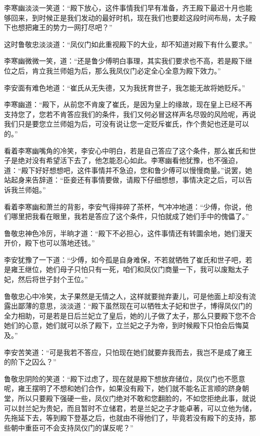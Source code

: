 李寒幽淡淡一笑道：“殿下放心，这件事情我们早有准备，齐王殿下最迟十月也能够回来，到时候正是我们发动的最好时机，现在我们也要趁这段时间布局，太子殿下也想把雍王的势力一网打尽吧？”

这时鲁敬忠淡淡道：“凤仪门如此重视殿下的大业，却不知道对殿下有什么要求。”

李寒幽微微一笑，道：“还是鲁少傅明白事理，其实我们要求也不高，若是殿下继位之后，肯立我兰师姐为后，那么我凤仪门必定全心全意为殿下效力。”

李安面有难色地道：“崔氏从无失德，又为我抚育世子，我怎能无故将她贬斥。”

李寒幽道：“殿下，从前您不肯废了崔氏，是因为皇上的缘故，现在皇上已经不再支持您了，您若不肯答应我们的条件，我们又何必冒这样声名尽毁的风险呢，再说我们只是要您立兰师姐为后，可没有说让您一定贬斥崔氏，作个贵妃也还是可以的。”

看着李寒幽嘴角的冷笑，李安心中明白，若是自己答应了这个条件，那么崔氏和世子是绝对没有希望活下去了，他怎能忍心如此。李寒幽看他犹豫，也不强迫，道：“殿下好好想想吧，这件事情并不急迫，您和鲁少傅可以慢慢商量。”说罢，她站起身来告辞道：“臣妾还有事情要做，请殿下仔细想想，事情决定之后，可以告诉我兰师姐。”

看着李寒幽和萧兰的背影，李安气得摔碎了茶杯，气冲冲地道：“少傅，你说，他们哪里把我看在眼里，我若是答应了这个条件，只怕就成了她们手中的傀儡了。”

鲁敬忠神色冷厉，半晌才道：“殿下不必担心，这件事情还有转圜余地，她们漫天开价，殿下也可以落地还钱。”

李安犹豫了一下道：“少傅，如今孤是自身难保，不若就牺牲了崔氏和世子吧，若是雍王继位，她们母子只怕只有一死，咱们和凤仪门商量一下，我可以废黜太子妃，然后将世子封个王位。”

鲁敬忠心中冷笑，太子果然是无情之人，这样就要抛弃妻儿，可是他面上却没有流露出鄙薄的意思，淡淡道：“殿下虽然现在可以牺牲太子妃和世子，博得凤仪门的全力相助，可是若是日后兰妃立了皇后，她的儿子做了太子，那么只要殿下您不合她们的心意，她们就可以杀了殿下，立兰妃之子为帝，到时候殿下只怕会后悔莫及。”

李安苦笑道：“可是我若不答应，只怕现在她们就要弃我而去，我岂不是成了雍王的阶下之囚么？”

鲁敬忠阴险的笑道：“殿下过虑了，现在就是殿下想放弃储位，凤仪门也不愿意呢，雍王摆明了不想和她们合作，如果没有殿下，她们就不能名正言顺的跻身朝堂，所以只要殿下强硬一些，凤仪门绝对不敢和您翻脸的，不如您拒绝此事，就说可以封兰妃为贵妃，而且暂时不立储君，若是兰妃之子才能卓著，可以立他为储，先拖延下去，等到殿下登基之后，也就由不得他们了，毕竟若没有殿下的支持，那些朝中重臣可不会支持凤仪门的谋反呢？”

